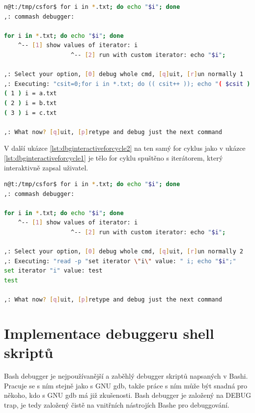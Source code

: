 \documentclass[thesis=M,czech]{FITthesis}[2012/06/26]
\begin{document}
\begin{minipage}{\linewidth}
\begin{lstlisting}[language=bash, caption={Debugger interaktivního shellu - výpis hodnot iterátoru for cyklu }, label={lst:dbginteractiveforcycle1}]
n@t:/tmp/csfor$ for i in *.txt; do echo "$i"; done
,: commash debugger:

for i in *.txt; do echo "$i"; done
    ^-- [1] show values of iterator: i
                   ^-- [2] run with custom iterator: echo "$i";

,: Select your option, [0] debug whole cmd, [q]uit, [r]un normally 1
,: Executing: "csit=0;for i in *.txt; do (( csit++ )); echo "( $csit ) i = $i"; done"
( 1 ) i = a.txt
( 2 ) i = b.txt
( 3 ) i = c.txt

,: What now? [q]uit, [p]retype and debug just the next command
\end{lstlisting}
\end{minipage}

V další ukázce \ref{lst:dbginteractiveforcycle2} na ten samý for cyklus jako v ukázce \ref{lst:dbginteractiveforcycle1} je tělo for cyklu spuštěno s iterátorem, který interaktivně zapsal uživatel.

\begin{minipage}{\linewidth}
\begin{lstlisting}[language=bash, caption={Debugger interaktivního shellu - změna iterátoru for cyklu}, label={lst:dbginteractiveforcycle2}]
n@t:/tmp/csfor$ for i in *.txt; do echo "$i"; done
,: commash debugger:

for i in *.txt; do echo "$i"; done
    ^-- [1] show values of iterator: i
                   ^-- [2] run with custom iterator: echo "$i";

,: Select your option, [0] debug whole cmd, [q]uit, [r]un normally 2
,: Executing: "read -p "set iterator \"i\" value: " i; echo "$i";"
set iterator "i" value: test
test

,: What now? [q]uit, [p]retype and debug just the next command
\end{lstlisting}
\end{minipage}





\section{Implementace debuggeru shell skriptů}

Bash debugger je nejpoužívanější a zaběhlý debugger skriptů napsaných v Bashi. Pracuje se s ním stejně jako s GNU gdb, takže práce s ním může být snadná pro někoho, kdo s GNU gdb má již zkušenosti. Bash debugger je založený na DEBUG trap, je tedy založený čistě na vnitřních nástrojích Bashe pro debuggování.
\end{document}
